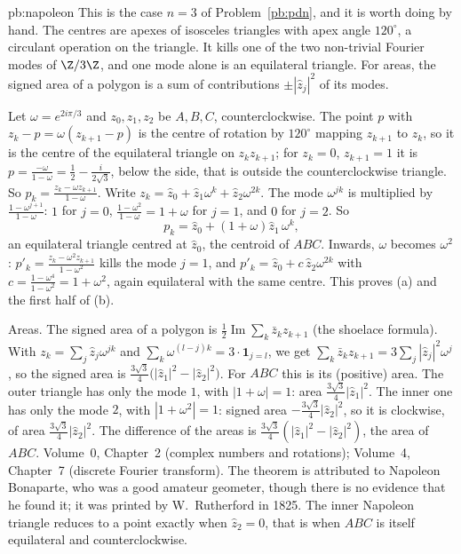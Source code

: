 \begin{solution}{pb:napoleon}
\idea This is the case $n=3$ of Problem~\ref{pb:pdn}, and it is worth doing by hand. The centres are apexes of isosceles
triangles with apex angle $120^\circ$, a circulant operation on the triangle. It kills one of the two non-trivial Fourier
modes of $\Z/3\Z$, and one mode alone is an equilateral triangle. For areas, the signed area of a polygon is a sum of
contributions $\pm|\hat z_j|^2$ of its modes.

\writeup Let $\omega=e^{2i\pi/3}$ and $z_0,z_1,z_2$ be $A,B,C$, counterclockwise. The point $p$ with
$z_k-p=\omega(z_{k+1}-p)$ is the centre of rotation by $120^\circ$ mapping $z_{k+1}$ to $z_k$, so it is the centre of the
equilateral triangle on $z_kz_{k+1}$; for $z_k=0$, $z_{k+1}=1$ it is $p=\frac{-\omega}{1-\omega}=\frac12-\frac i{2\sqrt3}$, below
the side, that is outside the counterclockwise triangle. So $p_k=\frac{z_k-\omega z_{k+1}}{1-\omega}$. Write
$z_k=\hat z_0+\hat z_1\omega^k+\hat z_2\omega^{2k}$. The mode $\omega^{jk}$ is multiplied by $\frac{1-\omega^{j+1}}{1-\omega}$:
$1$ for $j=0$, $\frac{1-\omega^2}{1-\omega}=1+\omega$ for $j=1$, and $0$ for $j=2$. So
\[
p_k=\hat z_0+(1+\omega)\hat z_1\,\omega^k,
\]
an equilateral triangle centred at $\hat z_0$, the centroid of $ABC$. Inwards, $\omega$ becomes $\omega^2$:
$p'_k=\frac{z_k-\omega^2z_{k+1}}{1-\omega^2}$ kills the mode $j=1$, and $p'_k=\hat z_0+c\,\hat z_2\omega^{2k}$ with
$c=\frac{1-\omega^4}{1-\omega^2}=1+\omega^2$, again equilateral with the same centre. This proves (a) and the first half of (b).

Areas. The signed area of a polygon is $\frac12\operatorname{Im}\sum_k\bar z_kz_{k+1}$ (the shoelace formula). With
$z_k=\sum_j\hat z_j\omega^{jk}$ and $\sum_k\omega^{(l-j)k}=3\cdot\mathbf 1_{j=l}$, we get $\sum_k\bar z_kz_{k+1}=3\sum_j|\hat z_j|^2\omega^j$,
so the signed area is $\frac{3\sqrt3}4\bigl(|\hat z_1|^2-|\hat z_2|^2\bigr)$. For $ABC$ this is its (positive) area. The outer
triangle has only the mode $1$, with $|1+\omega|=1$: area $\frac{3\sqrt3}4|\hat z_1|^2$. The inner one has only the mode $2$,
with $|1+\omega^2|=1$: signed area $-\frac{3\sqrt3}4|\hat z_2|^2$, so it is clockwise, of area $\frac{3\sqrt3}4|\hat z_2|^2$. The
difference of the areas is $\frac{3\sqrt3}4(|\hat z_1|^2-|\hat z_2|^2)$, the area of $ABC$.
\tools Volume~0, Chapter~2 (complex numbers and rotations); Volume~4, Chapter~7 (discrete Fourier transform).
\leads The theorem is attributed to Napoleon Bonaparte, who was a good amateur geometer, though there is no evidence that he
found it; it was printed by W.~Rutherford in 1825. The inner Napoleon triangle reduces to a point exactly when
$\hat z_2=0$, that is when $ABC$ is itself equilateral and counterclockwise.
\end{solution}


